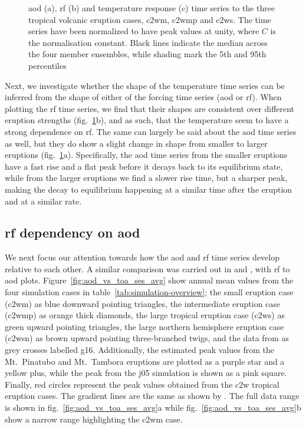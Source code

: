 \documentclass{ametsocV6.1}
\begin{document}
\begin{figure}
  \caption{\gls{aod} (a), \gls{rf} (b) and temperature response (c) time series to the three tropical volcanic eruption cases,
    \gls{c2wm}, \gls{c2wmp} and \gls{c2ws}. The time series have been normalized
    to have peak values at unity, where \(C\) is
    the normalisation constant. Black lines indicate the median across the four member
    ensembles, while shading mark the 5th and 95th
    percentiles}\label{fig:compare-waveform-temp}%
\end{figure}

Next, we investigate whether the shape of the temperature time series can be inferred
from the shape of either of the forcing time series (\gls{aod} or \gls{rf}). When
plotting the \gls{rf} time series, we find that their shapes are consistent over
different eruption strengths (fig.~\ref{fig:compare-waveform-temp}b), and as such, that
the temperature seem to have a strong dependence on \gls{rf}. The same can largely be
said about the \gls{aod} time series as well, but they do show a slight change in shape
from smaller to larger eruptions (fig.~\ref{fig:compare-waveform-temp}a). Specifically,
the \gls{aod} time series from the smaller eruptions have a fast rise and a flat peak
before it decays back to its equilibrium state, while from the larger eruptions we find
a slower rise time, but a sharper peak, making the decay to equilibrium happening at a
similar time after the eruption and at a similar rate.

\subsection{\gls{rf} dependency on \gls{aod}}

We next focus our attention towards how the \gls{aod} and \gls{rf} time series develop
relative to each other. A similar comparison was carried out in
\citet[][their Fig.\ 4]{gregory2016} and \citet[][their Fig.\ 1]{marshall2020}, with
\gls{rf} to \gls{aod} plots. Figure~\ref{fig:aod_vs_toa_ses_avg} show annual mean values
from the four simulation cases in table~\ref{tab:simulation-overview}; the small
eruption case (\gls{c2wm}) as blue downward pointing triangles, the intermediate
eruption case (\gls{c2wmp}) as orange thick diamonds, the large tropical eruption case
(\gls{c2ws}) as green upward pointing triangles, the large northern hemisphere eruption
case (\gls{c2wsn}) as brown upward pointing three-branched twigs, and the data from
\citet[][Fig.\ 4, black crosses from HadCM3 sstPiHistVol]{gregory2016} as grey crosses
labelled \gls{g16}. Additionally, the estimated peak values from the Mt.\
Pinatubo and Mt.\ Tambora eruptions are plotted as a purple star and a yellow plus,
while the peak from the \gls{j05} simulation is shown as a pink square. Finally, red
circles represent the peak values obtained from the \gls{c2w} tropical eruption cases.
The gradient lines are the same as shown by \citet{gregory2016}. The full data range is
shown in fig.~\ref{fig:aod_vs_toa_ses_avg}a while fig.~\ref{fig:aod_vs_toa_ses_avg}b
show a narrow range highlighting the \gls{c2wm} case.
\end{document}

